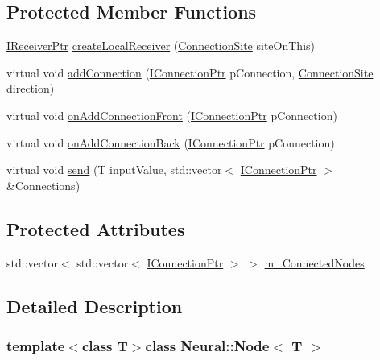 \subsection*{Protected Member Functions}
\begin{DoxyCompactItemize}
\item 
\hyperlink{class_neural_1_1_node_a4bce103df3f00eee1582929b882c1bf7}{IReceiverPtr} \hyperlink{class_neural_1_1_node_a12b755fa8c003fea19c200d53c1a381c}{createLocalReceiver} (\hyperlink{namespace_neural_add871cb0324e8abfb693026afba3a621}{ConnectionSite} siteOnThis)
\item 
virtual void \hyperlink{class_neural_1_1_node_a58ab4ae58a4f4750cf0240c41680d870}{addConnection} (\hyperlink{class_neural_1_1_i_node_a5243be0a422bcddc5a71a79920d09fd1}{IConnectionPtr} pConnection, \hyperlink{namespace_neural_add871cb0324e8abfb693026afba3a621}{ConnectionSite} direction)
\item 
virtual void \hyperlink{class_neural_1_1_node_adcf046af875a065c1568a0fe622bc857}{onAddConnectionFront} (\hyperlink{class_neural_1_1_i_node_a5243be0a422bcddc5a71a79920d09fd1}{IConnectionPtr} pConnection)
\item 
virtual void \hyperlink{class_neural_1_1_node_a81b82d7c733b24fd5ced314165acd930}{onAddConnectionBack} (\hyperlink{class_neural_1_1_i_node_a5243be0a422bcddc5a71a79920d09fd1}{IConnectionPtr} pConnection)
\item 
virtual void \hyperlink{class_neural_1_1_node_af6f9ee5e594ee2dad47f42753d6fa810}{send} (T inputValue, std::vector$<$ \hyperlink{class_neural_1_1_i_node_a5243be0a422bcddc5a71a79920d09fd1}{IConnectionPtr} $>$ \&Connections)
\end{DoxyCompactItemize}
\subsection*{Protected Attributes}
\begin{DoxyCompactItemize}
\item 
std::vector$<$ std::vector$<$ \hyperlink{class_neural_1_1_i_node_a5243be0a422bcddc5a71a79920d09fd1}{IConnectionPtr} $>$ $>$ \hyperlink{class_neural_1_1_node_a61a2cddb43ce07b06bda9112ffba0fa4}{m\_\-ConnectedNodes}
\end{DoxyCompactItemize}


\subsection{Detailed Description}
\subsubsection*{template$<$class T$>$class Neural::Node$<$ T $>$}




